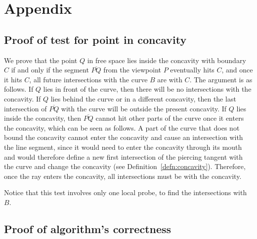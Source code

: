 \documentclass[10pt,twocolumn]{article}
\newcommand{\seg}[1]{\mbox{$\overline{#1}$}}
\begin{document}

\section{Appendix}
\label{sec:appendix}

\subsection{Proof of test for point in concavity}
\label{sec:ptinconcavity}

We prove that the point $Q$ in free space lies inside the concavity with boundary $C$
if and only if the segment \seg{PQ} from the viewpoint $P$
eventually hits $C$, and once it hits $C$, all future intersections with the curve $B$ 
are with $C$.
The argument is as follows.
If $Q$ lies in front of the curve, then there will be no intersections with
the concavity.
If $Q$ lies behind the curve or in a different concavity,
then the last intersection of \seg{PQ} with the curve will be 
outside the present concavity.
If $Q$ lies inside the concavity,
then \seg{PQ} cannot hit other parts of the curve once it enters the concavity,
which can be seen as follows.
A part of the curve that does not bound the concavity cannot enter the concavity
and cause an intersection with the line segment, since it would need to enter
the concavity through its mouth and would therefore define a new first intersection
of the piercing tangent with the curve and change the concavity 
(see Definition~\ref{defn:concavity}).
Therefore, once the ray enters the concavity, 
all intersections must be with the concavity.

Notice that this test involves only one local probe, to find the intersections with $B$.

\subsection{Proof of algorithm's correctness}
\end{document}

